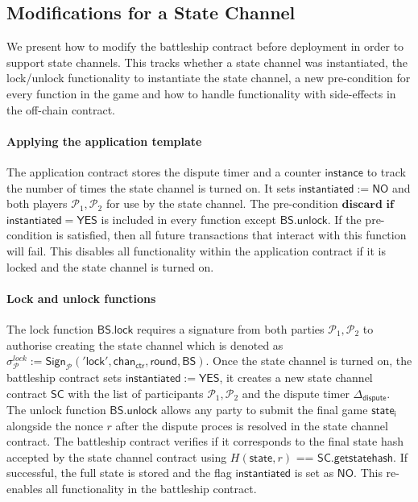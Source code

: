 \documentclass{llncs}
\newcommand{\instantiated}{\mathsf{instantiated}}
\newcommand{\instantiatedno}{\mathsf{NO}}
\newcommand{\instantiatedyes}{\mathsf{YES}}
\newcommand{\stateinfo}{\mathsf{state}}
\newcommand{\stateinfoi}{\mathsf{state}_{\mathsf{i}}}
\newcommand{\participant}{\mathcal{P}}
\newcommand{\statechannel}{\mathsf{SC}}
\newcommand{\statechannelgetcommitment}{\mathsf{SC}.\mathsf{getstatehash}}
\newcommand{\sign}{\mathsf{Sign}}
\newcommand{\battleship}{\mathsf{BS}}
\newcommand{\battleshiplock}{\mathsf{BS.lock}}
\newcommand{\battleshipunlock}{\mathsf{BS.unlock}}
\newcommand{\timerdispute}{\mathsf{\Delta}_{\mathsf{dispute}}}
\begin{document}
\subsection{Modifications for a State Channel}

We present how to modify the battleship contract before deployment in order to support state channels.
This tracks whether a state channel was instantiated,  the lock/unlock functionality to instantiate the state channel, a new pre-condition for every function in the game and how to handle functionality with side-effects in the off-chain contract. 

\paragraph{Applying the application template}
The application contract stores the dispute timer and a counter $\mathsf{instance}$ to track the number of times the state channel is turned on. 
It sets $\instantiated := \instantiatedno$ and both players $\participant_{1},\participant_{2}$ for use by the state channel.
The pre-condition $\textbf{discard if}$ $ \instantiated  = \instantiatedyes$ is included in every function except $\battleshipunlock$. 
If the pre-condition is satisfied, then all future transactions that interact with this function will fail.
This disables all functionality within the application contract if it is locked and the state channel is turned on. 

\paragraph{Lock and unlock functions} 
The lock function $\battleshiplock$ requires a signature from both parties $\participant_{1},\participant_{2}$ to authorise creating the state channel which is denoted as $\sigma^{lock}_{\participant} := \sign_{\participant}('\mathsf{lock}', \mathsf{chan}_{\mathsf{ctr}}, \mathsf{round}, \battleship)$.
Once the state channel is turned on, the battleship contract sets $\instantiated := \instantiatedyes$, it creates a new state channel contract $\statechannel$ with the list of participants $\participant_{1},\participant_{2}$ and the dispute timer $\timerdispute$. 
The unlock function $\battleshipunlock$ allows any party to submit the final game $\stateinfoi$ alongside the nonce $r$ after the dispute proces is resolved in the state channel contract. 
The battleship contract verifies if it corresponds to the final state hash accepted by the state channel contract using $H(\stateinfo,r)$ == $\statechannelgetcommitment$.
If successful, the full state is stored and the flag $\instantiated$ is set as $\instantiatedno$.
This re-enables all functionality in the battleship contract. 
\end{document}
